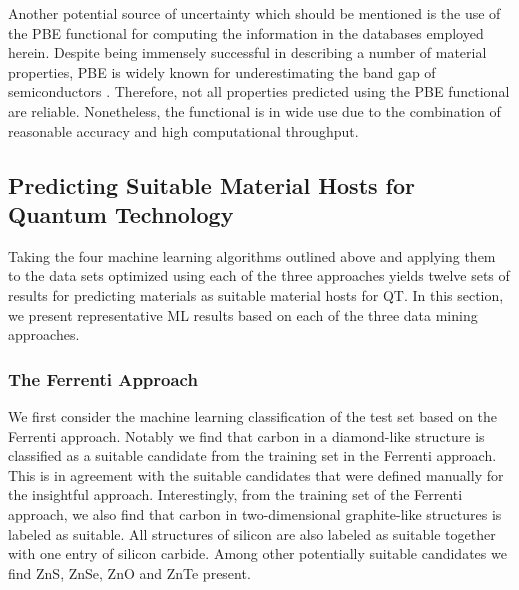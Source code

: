 \documentclass[superscriptaddress,unsortedaddress,
 amsmath,amssymb,
 aps,
]{revtex4-2}
\begin{document}
Another potential source of uncertainty which should be mentioned is the use of the PBE functional for computing the information in the databases employed herein. Despite being immensely successful in describing a number of material properties, PBE is widely known for underestimating the band gap of semiconductors \cite{Freysoldt2014}. Therefore, not all properties predicted using the PBE functional are reliable. Nonetheless, the functional is in wide use due to the combination of reasonable accuracy and high computational throughput. 

\subsection*{Predicting Suitable Material Hosts for Quantum Technology}

Taking the four machine learning algorithms outlined above and applying them to the data sets optimized using each of the three approaches yields twelve sets of results for predicting  materials as suitable material hosts for QT. In this section, we present representative ML results based on each of the three data mining approaches. 

\subsubsection*{The Ferrenti Approach}
We first consider the machine learning classification of the test set based on the Ferrenti approach. 
Notably we find that carbon in a diamond-like structure is classified as a suitable candidate from the training set in the Ferrenti approach. 
This is in agreement with the suitable candidates that were defined manually for the insightful approach. 
Interestingly, from the training set of the Ferrenti approach, we also find that carbon in two-dimensional graphite-like structures is labeled as suitable. 
All structures of silicon are also labeled as suitable together with one entry of silicon carbide. 
Among other potentially suitable candidates we find ZnS, ZnSe, ZnO and ZnTe present. 

%
% 
%
\end{document}
